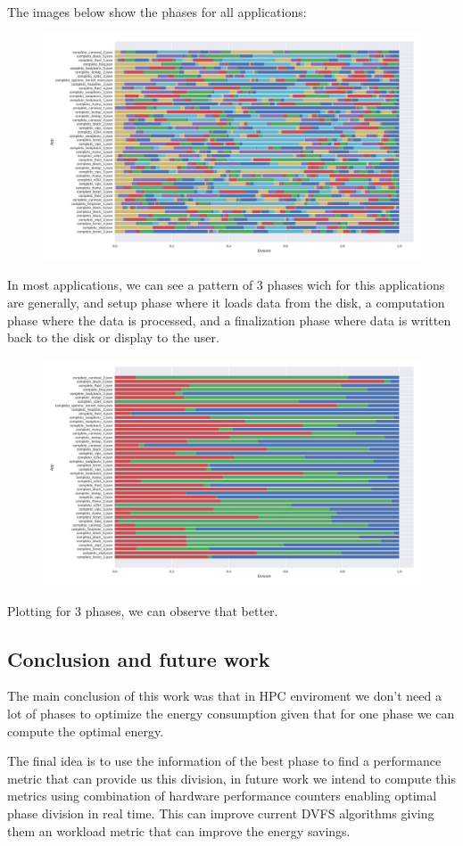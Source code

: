 The images below show the phases for all applications:
\begin{figure}[h]
\includegraphics[width=\columnwidth]{phases/figures/phase_division_35.png}
\end{figure}
In most applications, we can see a pattern of 3 phases wich for this applications are generally, and setup phase where it loads data from the disk, a computation phase where the data is processed, and a finalization phase where data is written back to the disk or display to the user.

\begin{figure}[h]
\includegraphics[width=\columnwidth]{phases/figures/phase_division_3.png}
\end{figure}
Plotting for 3 phases, we can observe that better.


\subsection{Conclusion and future work}
The main conclusion of this work was that in HPC enviroment we don't need a lot of phases to optimize the energy consumption given that for one phase we can compute the optimal energy.

The final idea is to use the information of the best phase to find a performance metric that can provide us this division, in future work we intend to compute this metrics using combination of hardware performance counters enabling optimal phase division in real time. This can improve current DVFS algorithms giving them an workload metric that can improve the energy savings.